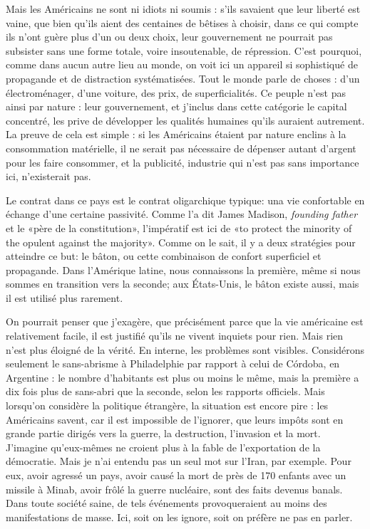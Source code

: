 \documentclass[a4paper, 12pt]{article}
\begin{document}
Mais les Américains ne sont ni idiots ni soumis : s'ils savaient que leur
liberté est vaine, que bien qu'ils aient des centaines de bêtises à choisir,
dans ce qui compte ils n'ont guère plus d'un ou deux choix, leur gouvernement ne
pourrait pas subsister sans une forme totale, voire insoutenable, de répression.
C'est pourquoi, comme dans aucun autre lieu au monde, on voit ici un appareil si
sophistiqué de propagande et de distraction systématisées. Tout le monde parle
de choses : d'un électroménager, d'une voiture, des prix, de superficialités. Ce
peuple n'est pas ainsi par nature : leur gouvernement, et j'inclus dans cette
catégorie le capital concentré, les prive de développer les qualités humaines
qu'ils auraient autrement. La preuve de cela est simple : si les Américains
étaient par nature enclins à la consommation matérielle, il ne serait pas
nécessaire de dépenser autant d'argent pour les faire consommer, et la
publicité, industrie qui n'est pas sans importance ici, n'existerait pas.

Le contrat dans ce pays est le contrat oligarchique typique: una vie
confortable en échange d'une certaine passivité. Comme l'a dit James Madison,
\textit{founding father} et le «père de la constitution», l'impératif est ici de
«to protect the minority of the opulent against the majority». Comme on le sait,
il y a deux stratégies pour atteindre ce but: le bâton, ou cette combinaison de
confort superficiel et propagande. Dans l'Amérique latine, nous connaissons la
première, même si nous sommes en transition vers la seconde; aux États-Unis,
le bâton existe aussi, mais il est utilisé plus rarement.

On pourrait penser que j’exagère, que précisément parce que la vie américaine
est relativement facile, il est justifié qu’ils ne vivent inquiets pour rien.
Mais rien n’est plus éloigné de la vérité. En interne, les problèmes sont
visibles. Considérons seulement le sans-abrisme à Philadelphie par rapport à
celui de Córdoba, en Argentine : le nombre d’habitants est plus ou moins le
même, mais la première a dix fois plus de sans-abri que la seconde, selon les
rapports officiels. Mais lorsqu’on considère la politique étrangère, la
situation est encore pire : les Américains savent, car il est impossible de
l’ignorer, que leurs impôts sont en grande partie dirigés vers la guerre, la
destruction, l’invasion et la mort. J’imagine qu’eux-mêmes ne croient plus à la
fable de l’exportation de la démocratie. Mais je n’ai entendu pas un seul mot
sur l’Iran, par exemple. Pour eux, avoir agressé un pays, avoir causé la mort de
près de 170 enfants avec un missile à Minab, avoir frôlé la guerre nucléaire,
sont des faits devenus banals. Dans toute société saine, de tels événements
provoqueraient au moins des manifestations de masse. Ici, soit on les ignore,
soit on préfère ne pas en parler.
\end{document}
